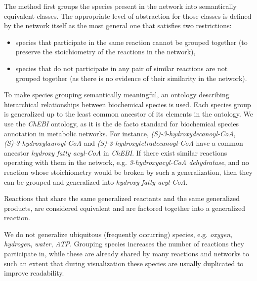 \documentclass{bmcart}
\begin{document}
The method first groups the species present in the network into semantically equivalent classes. The appropriate level of abstraction for those classes is defined by the network itself as the most general one that satisfies two restrictions: 
\begin{itemize}
 \item species that participate in the same reaction cannot be grouped together (to preserve the stoichiometry of the reactions in the network),
 \item species that do not participate in any pair of similar reactions are not grouped together (as there is no evidence of their similarity in the network).
\end{itemize}
To make species grouping semantically meaningful, an ontology describing hierarchical relationships between biochemical species is used. Each species group is generalized up to the least common ancestor of its elements in the ontology. We use the \textit{ChEBI} ontology, as it is the de facto standard for biochemical species annotation in metabolic networks. %
For instance, \textit{(S)-3-hydroxydecanoyl-CoA}, \textit{(S)-3-hydroxylauroyl-CoA} and \textit{(S)-3-hydroxytetradecanoyl-CoA} have a common ancestor \textit{hydroxy fatty acyl-CoA} in \textit{ChEBI}. If there exist similar reactions operating with them in the network, e.g. \textit{3-hydroxyacyl-CoA dehydratase}, and no reaction whose stoichiometry would be broken by such a generalization, then they can be grouped and generalized into \textit{hydroxy fatty acyl-CoA}.

Reactions that share the same generalized reactants and the same generalized products, are considered equivalent and are factored together into a generalized reaction. 

We do not generalize ubiquitous (frequently occurring) species, e.g. \textit{oxygen}, \textit{hydrogen}, \textit{water}, \textit{ATP}. Grouping species increases the number of reactions they participate in, while these are already shared by many reactions and networks to such an extent that during visualization these species are usually duplicated\cite{Rohn2012} to improve readability.

\end{document}
